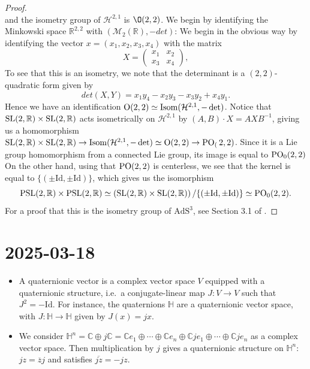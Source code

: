 \documentclass{report}
\begin{document}
\begin{itemize}
\begin{proof}
\[        \]
        and the isometry group of $\mathcal H^{2,1}$ is $\O(2,2)$.
        We begin by identifying the Minkowski space $\mathbb R^{2,2}$ with $(\mathcal M_2(\mathbb R), -det)$:
        We begin in the obvious way by identifying the vector $x = (x_1, x_2, x_3, x_4)$ with the matrix
        \[
        X = \begin{pmatrix}
            x_1 & x_2 \\
            x_3 & x_4
        \end{pmatrix},
        \]
        To see that this is an isometry, we note that the determinant is a $(2,2)$-quadratic form given by
        \[
        det(X,Y) = x_1 y_4 - x_2 y_3 - x_3 y_2 + x_4 y_1.
        \]
        Hence we have an identification $\operatorname{{\mathrm{O}}}(2,2) \simeq \mathrm{Isom}(\mathcal H^{2,1}, -\det)$.
        Notice that $\operatorname{{\mathrm{SL}}}(2, \mathbb R) \times \operatorname{{\mathrm{SL}}}(2,\mathbb R)$ acts isometrically on $\mathcal H^{2,1}$ by $(A, B) \cdot X = AXB^{-1}$, giving us a homomorphism $\operatorname{{\mathrm{SL}}}(2,\mathbb R) \times \operatorname{{\mathrm{SL}}}(2,\mathbb R) \to \mathrm{Isom}(\mathcal H^{2,1}, -\det) \simeq \operatorname{{\mathrm{O}}}(2,2) \to \operatorname{{\mathrm{PO}}}_(2,2)$.
        Since it is a Lie group homomorphism from a connected Lie group, its image is equal to $\operatorname{{\mathrm{PO}}}_0(2,2)$
        On the other hand, using that $\operatorname{{\mathrm{PO}}}(2,2)$ is centerless, we see that the kernel is equal to $\{(\pm \mathrm{Id}, \pm \mathrm{Id})\}$, which gives us the isomorphism
        \[
        \operatorname{{\mathrm{PSL}}}(2,\mathbb R) \times \operatorname{{\mathrm{PSL}}}(2,\mathbb R) \simeq \left(
            \operatorname{{\mathrm{SL}}}(2,\mathbb R) \times \operatorname{{\mathrm{SL}}}(2,\mathbb R)
        \right) / \{(\pm \mathrm{Id}, \pm \mathrm{Id})\} \simeq \operatorname{{\mathrm{PO}}}_0(2,2).
        \]
        For a proof that this is the isometry group of $\mathrm{AdS}^3$, see Section 3.1 of \cite{bonsante2020anti}.
    \end{proof}
\end{itemize}
\section{2025-03-18}
\begin{itemize}
    \item A quaternionic vector is a complex vector space $V$ equipped with a quaternionic structure, i.e.\ a conjugate-linear map $J: V \to V$ such that $J^2 = -\mathrm{Id}$.
    For instance, the quaternions $\mathbb H$ are a quaternionic vector space, with $J: \mathbb H \to \mathbb H$ given by $J(x) = j x$.
    \item We consider $\mathbb H^n = \mathbb C \oplus j \mathbb C = \mathbb C e_1 \oplus \cdots \oplus \mathbb C e_n \oplus \mathbb C je_1 \oplus \cdots \oplus \mathbb C j e_n$ as a complex vector space.
    Then multiplication by $j$ gives a quaternionic structure on $\mathbb H^n$: $jz = \overline z j$ and satisfies $\overline{jz} = - jz$.
\end{itemize}
\end{document}
